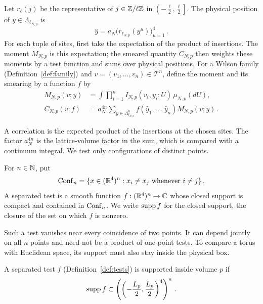 \begin{definition}\label{def:moments}
Let $r_\ell(j)$ be the representative of $j\in\mathbb Z/\ell\mathbb Z$ in
$\left(-\frac{\ell}{2},\frac{\ell}{2}\right]$.
The physical position of $y\in\Lambda_{\ell_{N,p}}$ is
\begin{equation}\label{eq:physical-position}
\hat y=a_N\bigl(r_{\ell_{N,p}}(y^\mu)\bigr)_{\mu=1}^4\,.
\end{equation}
For each tuple of sites, first take the expectation of the product of insertions. The moment $M_{N,p}$ is this expectation; the smeared quantity $C_{N,p}$ then weights these moments by a test function and sums over physical positions.
For a Wilson family (Definition~\ref{def:family}) and $v=(v_1,\ldots,v_n)\in\mathcal T^n$, define the moment and its smearing by a function $f$ by
\begin{equation}\label{eq:smear}
\begin{aligned}
M_{N,p}(v;y)&=\int\prod_{i=1}^n I_{N,p}(v_i,y_i;U)\,\mu_{N,p}(dU),\\
C_{N,p}(v;f)&=a_N^{4n}\sum_{y\in\Lambda_{\ell_{N,p}}^n}
 f(\hat y_1,\ldots,\hat y_n)M_{N,p}(v;y)\,.
\end{aligned}
\end{equation}
\end{definition}

A correlation is the expected product of the insertions at the chosen sites.
The factor $a_N^{4n}$ is the lattice-volume factor in the sum, which is compared with a continuum integral.
We test only configurations of distinct points.

\begin{definition}\label{def:tests}\label{def:separated-test}
For $n\in\mathbb N$, put
\begin{equation}\label{eq:conf}
\operatorname{Conf}_{n}=\{x\in(\mathbb R^4)^n:x_i\ne x_j\text{ whenever }i\ne j\}\,.
\end{equation}
A separated test is a smooth function $f:(\mathbb R^4)^n\to\mathbb C$ whose closed support is compact and contained in $\operatorname{Conf}_{n}$.
We write $\operatorname{supp} f$ for the closed support, the closure of the set on which $f$ is nonzero.
\end{definition}

Such a test vanishes near every coincidence of two points.
It can depend jointly on all $n$ points and need not be a product of one-point tests.
To compare a torus with Euclidean space, its support must also stay inside the physical box.

\begin{definition}\label{def:admissible}\label{def:admissible-test}
A separated test $f$ (Definition~\ref{def:tests}) is supported inside volume $p$ if
\begin{equation}\label{eq:admissible}
\operatorname{supp} f\subset
\left(\left(-\frac{L_p}{2},\frac{L_p}{2}\right)^4\right)^n\,.
\end{equation}
\end{definition}

